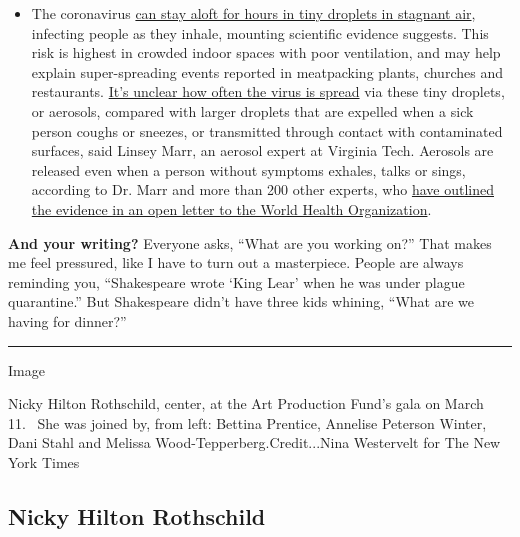 \begin{itemize}
  \begin{itemize}
  \tightlist
  \item
    The coronavirus
    \href{https://www.nytimes3xbfgragh.onion/2020/07/04/health/239-experts-with-one-big-claim-the-coronavirus-is-airborne.html?action=click\&pgtype=Article\&state=default\&region=MAIN_CONTENT_3\&context=storylines_faq}{can
    stay aloft for hours in tiny droplets in stagnant air}, infecting
    people as they inhale, mounting scientific evidence suggests. This
    risk is highest in crowded indoor spaces with poor ventilation, and
    may help explain super-spreading events reported in meatpacking
    plants, churches and restaurants.
    \href{https://www.nytimes3xbfgragh.onion/2020/07/06/health/coronavirus-airborne-aerosols.html?action=click\&pgtype=Article\&state=default\&region=MAIN_CONTENT_3\&context=storylines_faq}{It's
    unclear how often the virus is spread} via these tiny droplets, or
    aerosols, compared with larger droplets that are expelled when a
    sick person coughs or sneezes, or transmitted through contact with
    contaminated surfaces, said Linsey Marr, an aerosol expert at
    Virginia Tech. Aerosols are released even when a person without
    symptoms exhales, talks or sings, according to Dr. Marr and more
    than 200 other experts, who
    \href{https://academic.oup.com/cid/article/doi/10.1093/cid/ciaa939/5867798}{have
    outlined the evidence in an open letter to the World Health
    Organization}.
  \end{itemize}
\end{itemize}

\textbf{And your writing?} Everyone asks, ``What are you working on?''
That makes me feel pressured, like I have to turn out a masterpiece.
People are always reminding you, ``Shakespeare wrote `King Lear' when he
was under plague quarantine.'' But Shakespeare didn't have three kids
whining, ``What are we having for dinner?''

\begin{center}\rule{0.5\linewidth}{\linethickness}\end{center}

Image

Nicky Hilton Rothschild, center, at the Art Production Fund's gala on
March 11.~ She was joined by, from left: Bettina Prentice, Annelise
Peterson Winter, Dani Stahl and Melissa Wood-Tepperberg.Credit...Nina
Westervelt for The New York Times

\hypertarget{nicky-hilton-rothschild}{%
\subsection{Nicky Hilton Rothschild}\label{nicky-hilton-rothschild}}

